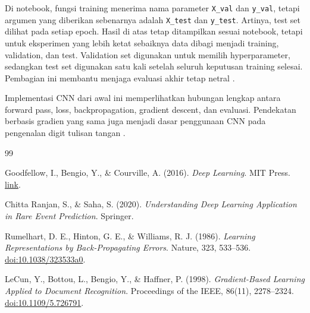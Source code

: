 \documentclass[12pt, letterpaper]{article}
\begin{document}
\begin{tcolorbox}[
    colback=myred!5,
    colframe=myred,
    title=Catatan tentang data evaluasi,
    fonttitle=\bfseries
]
Di notebook, fungsi training menerima nama parameter \texttt{X\_val} dan \texttt{y\_val}, tetapi argumen yang diberikan sebenarnya adalah \texttt{X\_test} dan \texttt{y\_test}. Artinya, test set dilihat pada setiap epoch. Hasil di atas tetap ditampilkan sesuai notebook, tetapi untuk eksperimen yang lebih ketat sebaiknya data dibagi menjadi training, validation, dan test. Validation set digunakan untuk memilih hyperparameter, sedangkan test set digunakan satu kali setelah seluruh keputusan training selesai. Pembagian ini membantu menjaga evaluasi akhir tetap netral \cite{goodfellow2016deep}.
\end{tcolorbox}

Implementasi CNN dari awal ini memperlihatkan hubungan lengkap antara forward pass, loss, backpropagation, gradient descent, dan evaluasi. Pendekatan berbasis gradien yang sama juga menjadi dasar penggunaan CNN pada pengenalan digit tulisan tangan \cite{lecun1998gradient}.

\begin{thebibliography}{99}

Goodfellow, I., Bengio, Y., \& Courville, A. (2016). \textit{Deep Learning}. MIT Press.
\href{https://www.deeplearningbook.org/}
{link}.

Chitta Ranjan, S., \& Saha, S. (2020). \textit{Understanding Deep Learning Application in Rare Event Prediction}. Springer.

Rumelhart, D. E., Hinton, G. E., \& Williams, R. J. (1986).
\textit{Learning Representations by Back-Propagating Errors}.
Nature, 323, 533--536.
\href{https://doi.org/10.1038/323533a0}{doi:10.1038/323533a0}.

LeCun, Y., Bottou, L., Bengio, Y., \& Haffner, P. (1998).
\textit{Gradient-Based Learning Applied to Document Recognition}.
Proceedings of the IEEE, 86(11), 2278--2324.
\href{https://doi.org/10.1109/5.726791}{doi:10.1109/5.726791}.
\end{thebibliography}
\end{document}
